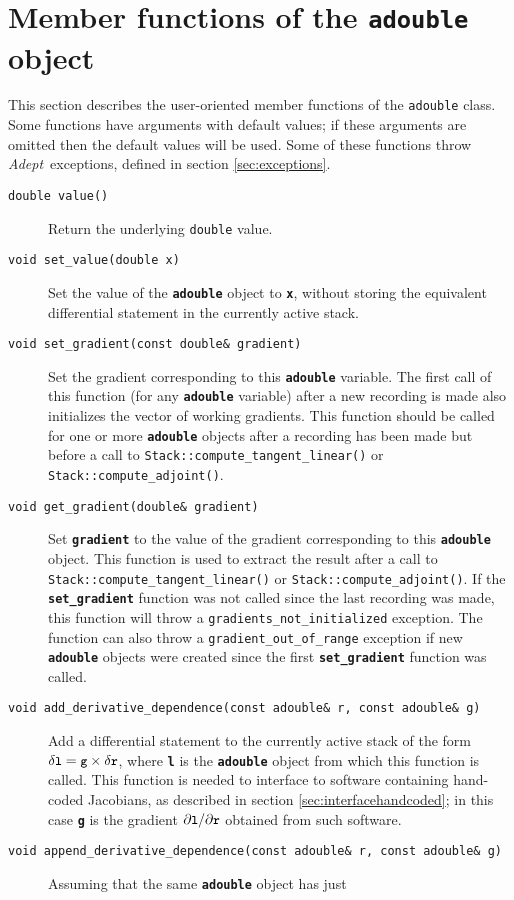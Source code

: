 \documentclass[a4,oneside]{book}
\def\codesize{\small}
\def\Adept{\emph{Adept}}
\def\code#1{{\codesize\texttt{#1}}}
\def\codebf#1{{\codesize\texttt{\textbf{#1}}}}
\def\citem#1{\item[{\codesize\texttt{#1}}]}
\def\codestyle#1{\texttt{#1}}
\begin{document}
\section{Member functions of the \codestyle{adouble} object}
\label{sec:adouble}
This section describes the user-oriented member functions of the
\code{adouble} class. Some functions have arguments with default
values; if these arguments are omitted then the default values will be
used. Some of these functions throw \Adept\ exceptions, defined in
section \ref{sec:exceptions}.
\begin{description}
\citem{double value()} Return the underlying \code{double} value.
%
\citem{void set\_value(double x)} Set the value of the \codebf{adouble}
object to \codebf{x}, without storing the equivalent differential
statement in the currently active stack.
%
\citem{void set\_gradient(const double\&\ gradient)} Set the
gradient corresponding to this \codebf{adouble} variable. The first call
of this function (for any \codebf{adouble} variable) after a new
recording is made also initializes the vector of working gradients.
This function should be called for one or more \codebf{adouble} objects
after a recording has been made but before a call to
\code{Stack::compute\_tangent\_linear()} or
\code{Stack::compute\_adjoint()}.
%
\citem{void get\_gradient(double\&\ gradient)} Set \codebf{gradient}
to the value of the gradient corresponding to this \codebf{adouble}
object. This function is used to extract the result after a call to
\code{Stack::compute\_tangent\_linear()} or
\code{Stack::compute\_adjoint()}. If the \codebf{set\_gradient} function
was not called since the last recording was made, this function will
throw a \code{gradients\_not\_initialized} exception.  The function
can also throw a \code{gradient\_out\_of\_range} exception if new
\codebf{adouble} objects were created since the first
\codebf{set\_gradient} function was called.
%
\citem{void add\_derivative\_dependence(const adouble\&\ r, const
  adouble\&\ g)} Add a differential statement to the currently active
stack of the form $\delta \codebf{l}=\codebf{g}\times\delta
\codebf{r}$, where \codebf{l} is the \codebf{adouble} object from which
this function is called.  This function is needed to interface to
software containing hand-coded Jacobians, as described in section
\ref{sec:interfacehandcoded}; in this case \codebf{g} is the gradient
$\partial\codebf{l}/\partial\codebf{r}$ obtained from such software.
%
\citem{void append\_derivative\_dependence(const adouble\&\ r, const
  adouble\&\ g)} Assuming that the same \codebf{adouble} object has just

\end{description}
\end{document}
